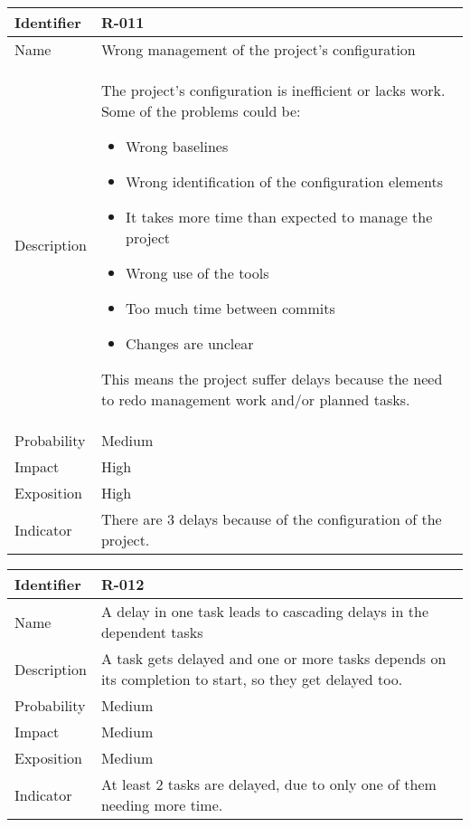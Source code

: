 \begin{table}[H]
	\begin{tabularx}{\textwidth}{|l|X|}
		\hline
		\rowcolor{gray!30}
		Identifier & \textbf{R-011} \\ \hline
		Name & Wrong management of the project's configuration\\ \hline
		Description & The project's configuration is inefficient or lacks work.
		Some of the problems could be:
		\vspace{-0.5em}
		\begin{itemize}
		\setlength\itemsep{0em}
			\item Wrong baselines
			\item Wrong identification of the configuration elements
			\item It takes more time than expected to manage the project
			\item Wrong use of the tools
			\item Too much time between commits
			\item Changes are unclear
		\end{itemize}
		\vspace{-0.5em}
		This means the project suffer delays because the need to redo management work and/or planned tasks. \\ \hline
		Probability & Medium\\ \hline
		Impact &  High\\ \hline
		Exposition &  High\\ \hline
		Indicator & There are 3 delays because of the configuration of the project.\\ \hline
	\end{tabularx}
\end{table}
\begin{table}[H]
	\begin{tabularx}{\textwidth}{|l|X|}
		\hline
		\rowcolor{gray!30}
		Identifier & \textbf{R-012} \\ \hline
		Name & A delay in one task leads to cascading delays in the dependent tasks\\ \hline
		Description & A task gets delayed and one or more tasks depends on its completion to start, so they get delayed too.\\ \hline
		Probability & Medium\\ \hline
		Impact &  Medium\\ \hline
		Exposition &  Medium\\ \hline
		Indicator & At least 2 tasks are delayed, due to only one of them needing more time.\\ \hline
	\end{tabularx}
\end{table}
